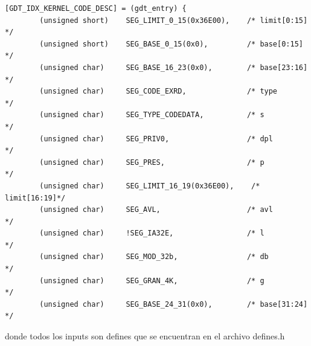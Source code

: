 \documentclass[a4paper]{article}
\newenvironment{codesnippet}{%
	\begin{Sbox}\begin{minipage}{\textwidth}\sffamily\small}%
	{\end{minipage}\end{Sbox}%
		\begin{center}%
		\vspace{-0.4cm}\colorbox{litegrey}{\TheSbox}\end{center}\vspace{0.3cm}}
\begin{document}
\begin{codesnippet}
\begin{verbatim}
[GDT_IDX_KERNEL_CODE_DESC] = (gdt_entry) {
        (unsigned short)    SEG_LIMIT_0_15(0x36E00),    /* limit[0:15]  */
        (unsigned short)    SEG_BASE_0_15(0x0),         /* base[0:15]   */
        (unsigned char)     SEG_BASE_16_23(0x0),        /* base[23:16]  */
        (unsigned char)     SEG_CODE_EXRD,              /* type         */ 
        (unsigned char)     SEG_TYPE_CODEDATA,          /* s            */
        (unsigned char)     SEG_PRIV0,                  /* dpl          */
        (unsigned char)     SEG_PRES,                   /* p            */
        (unsigned char)     SEG_LIMIT_16_19(0x36E00),    /* limit[16:19]*/
        (unsigned char)     SEG_AVL,                    /* avl          */
        (unsigned char)     !SEG_IA32E,                 /* l            */
        (unsigned char)     SEG_MOD_32b,                /* db           */
        (unsigned char)     SEG_GRAN_4K,                /* g            */
        (unsigned char)     SEG_BASE_24_31(0x0),        /* base[31:24]  */
\end{verbatim}
\end{codesnippet}

donde todos los inputs son defines que se encuentran en el archivo defines.h
\end{document}
